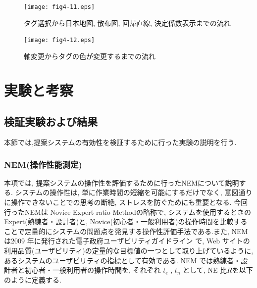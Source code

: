 \documentclass[sotsuron]{kuee}
\begin{document}
\begin{figure}
  \begin{center}
    \unitlength=1mm
   \texttt{[image: fig4-11.eps]}
  \end{center}
  \caption{タグ選択から日本地図, 散布図, 回帰直線, 決定係数表示までの流れ}
  \label{4-11}
\end{figure}

\begin{figure}
  \begin{center}
    \unitlength=1mm
   \texttt{[image: fig4-12.eps]}
  \end{center}
  \caption{軸変更からタグの色が変更するまでの流れ}
  \label{4-12}
\end{figure}






\chapter{実験と考察}


\section{検証実験および結果}

本節では,提案システムの有効性を検証するために行った実験の説明を行う.

\subsection{NEM(操作性能測定)}

本項では, 提案システムの操作性を評価するために行ったNEMについて説明する.
システムの操作性は, 単に作業時間の短縮を可能にするだけでなく, 意図通りに操作できないことでの思考の断絶, ストレスを防ぐためにも重要となる.
今回行ったNEMは Novice Expert ratio Methodの略称で, システムを使用するときのExpert(熟練者・設計者)と,
Novice(初心者・一般利用者)の操作時間を比較することで定量的にシステムの問題点を発見する操作性評価手法である.また, NEMは2009 年に発行された電子政府ユーザビリティガイドライン
\cite{5.1.1-1}で, Web サイトの利用品質(ユーザビリティ)の定量的な目標値の一つとして取り上げているように, あるシステムのユーザビリティの指標として有効である.
NEM では熟練者・設計者と初心者・一般利用者の操作時間を, それぞれ $t_{e}$ , $t_{n}$ として, NE 比$R$を以下のように定義する.
\end{document}
